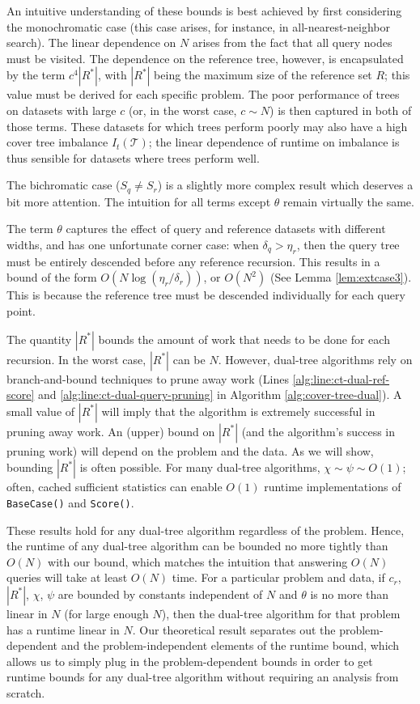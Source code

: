 An intuitive understanding of these bounds is best achieved by first considering
the monochromatic case (this case arises, for instance, in all-nearest-neighbor
search).  The linear dependence on $N$ arises from the fact that all query nodes
must be visited.  The dependence on the reference tree, however, is encapsulated
by the term $c^4 |R^*|$, with $|R^*|$ being the maximum size of the reference
set $R$; this value must be derived for each specific problem.  The poor
performance of trees on datasets with large $c$ (or, in the worst case, $c
\sim N$) is then captured in both of those terms.  These datasets for which
trees perform poorly may also have a high cover tree imbalance
$I_t(\mathscr{T})$; the linear dependence of runtime on imbalance is thus
sensible for datasets where trees perform well.

The bichromatic case ($S_q \ne S_r$) is a slightly more complex result which
deserves a bit more attention.  The intuition for all terms except $\theta$
remain virtually the same.

The term $\theta$ captures the effect of query and reference datasets with
different widths, and has one unfortunate corner case: when $\delta_q > \eta_r$,
then the query tree must be entirely descended before any reference recursion.
This results in a bound of the form $O(N \log (\eta_r / \delta_r))$, or
$O(N^2)$ (See Lemma \ref{lem:extcase3}).  This is because the reference tree
must be descended individually for each query point.

The quantity $|R^*|$ bounds the amount of work that needs to be done for each
recursion. In the worst case, $|R^*|$ can be $N$. However,
dual-tree algorithms rely on branch-and-bound techniques to prune away
work (Lines \ref{alg:line:ct-dual-ref-score} and
\ref{alg:line:ct-dual-query-pruning} in Algorithm \ref{alg:cover-tree-dual}). A
small value of $|R^*|$ will imply that the algorithm is extremely successful in
pruning away work.  An (upper) bound on $|R^*|$ (and the algorithm's
success in pruning work) will depend on the problem and the data.  As we will
show, bounding $|R^*|$ is often possible. %
For many dual-tree algorithms, $\chi \sim \psi \sim O(1)$; often, cached
sufficient statistics \citep{moore2000anchors} can enable $O(1)$ runtime
implementations of \texttt{BaseCase()} and \texttt{Score()}.

These results hold for any dual-tree algorithm regardless of the problem. Hence,
the runtime of any dual-tree algorithm
can be bounded no more tightly than $O(N)$ with our bound, which matches the
intuition that answering $O(N)$ queries will take at least $O(N)$ time. For a
particular problem and data, if $c_r$, $|R^*|$, $\chi$, $\psi$ are bounded by
constants independent of $N$ and $\theta$ is no more than linear in $N$ (for
large enough $N$), then the dual-tree algorithm for that problem has a runtime
linear in $N$.  Our theoretical result separates out the problem-dependent and
the problem-independent elements of the runtime bound, which allows us to simply
plug in the problem-dependent bounds in order to get runtime bounds for any
dual-tree algorithm without requiring an analysis from scratch.

